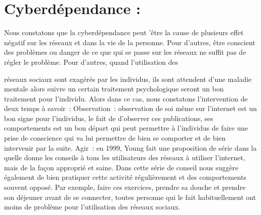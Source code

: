 \documentclass[12pt,a4paper,titlepage]{article}
\begin{document}
\section{Cyberdépendance : }
Nous constatons que la cyberdépendance peut ’être la cause
de plusieurs effet négatif sur les réseaux et dans la vie de la
personne. Pour d’autres, être conscient des problèmes ou
danger de ce que qui se passe sur les réseaux ne suffit pas de
régler le problème. Pour d’autres, quand l’utilisation des

réseaux sociaux sont exagérés par les individus, ils sont
attendent d’une maladie mentale alors suivre un certain
traitement psychologique seront un bon traitement pour
l’individu. Alors dans ce cas, nous constatons l’intervention de
deux temps à savoir :
Observation : observation de soi même sur l’internet est un
bon signe pour l’individus, le fait de d’observer ces
publications, ses comportements est un bon départ qui peut
permettre à l’individus de faire une prise de conscience qui va
lui permettre de bien se comporter et de bien intervenir par
la suite.
Agir : en 1999, Young fait une proposition de série dans la
quelle donne les conseils à tous les utilisateurs des réseaux à
utiliser l’internet, mais de la façon approprié et saine. Dans
cette série de conseil nous suggère également de bien
pratiquer cette activité régulièrement et des comportements
souvent opposé. Par exemple, faire ces exercices, prendre sa
douche et prendre son déjeuner avant de se connecter,
toutes personne qui le fait habituellement ont moins de
problème pour l’utilisation des réseaux sociaux.
\end{document}
